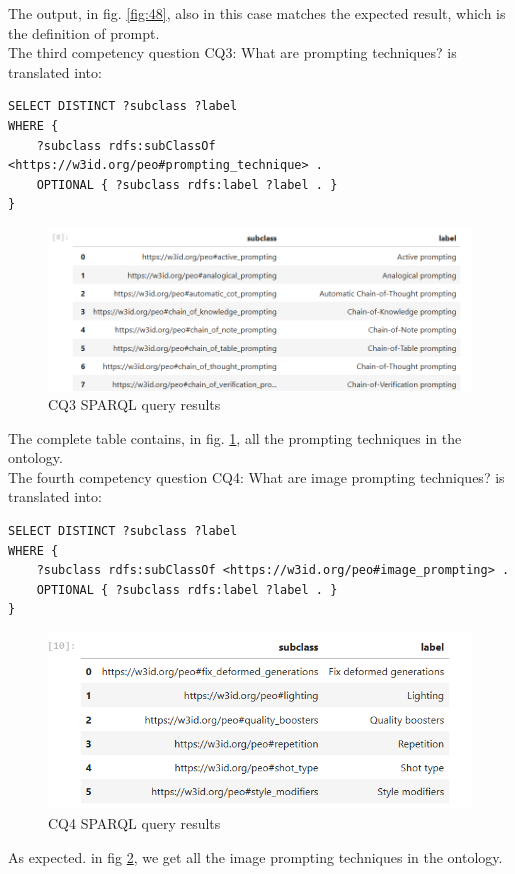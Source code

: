 The output, in fig. \ref{fig:48}, also in this case matches the expected result, which is the definition of prompt.\\

The third competency question CQ3: What are prompting techniques? is translated into:
\begin{lstlisting}
SELECT DISTINCT ?subclass ?label
WHERE {
    ?subclass rdfs:subClassOf <https://w3id.org/peo#prompting_technique> .
    OPTIONAL { ?subclass rdfs:label ?label . }
}
\end{lstlisting}

\begin{figure}[H]
    \centering
    \includegraphics[width=0.9\linewidth]{Figures/fig_49.png}
    \caption{CQ3 SPARQL query results}
    \label{fig:49}
\end{figure}
The complete table contains, in fig. \ref{fig:49}, all the prompting techniques in the ontology.\\

The fourth competency question CQ4: What are image prompting techniques? is translated into:
\begin{lstlisting}
SELECT DISTINCT ?subclass ?label
WHERE {
    ?subclass rdfs:subClassOf <https://w3id.org/peo#image_prompting> .
    OPTIONAL { ?subclass rdfs:label ?label . }
}
\end{lstlisting}

\begin{figure}[H]
    \centering
    \includegraphics[width=0.9\linewidth]{Figures/fig_50.png}
    \caption{CQ4 SPARQL query results}
    \label{fig:50}
\end{figure}
As expected. in fig \ref{fig:50}, we get all the image prompting techniques in the ontology.\\

